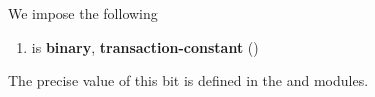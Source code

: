 We impose the following
\begin{enumerate}
    \item
	\rlpTxnSharedColumnRequiresEvmExecution{} is \textbf{binary}, \textbf{transaction-constant}
	(\sanityCheck)
\end{enumerate}
\saNote{}
The precise value of this bit is defined in the
\userTxnDataMod{} and \hubMod{} modules.
